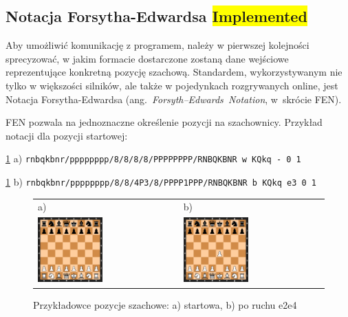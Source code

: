 \subsection{Notacja Forsytha-Edwardsa \colorbox{yellow}{Implemented}}
\label{subsec:notacja-fen}

Aby umożliwić komunikację z programem, należy w pierwszej kolejności sprecyzować, w jakim formacie dostarczone zostaną dane wejściowe reprezentujące konkretną pozycję szachową.
Standardem, wykorzystywanym nie tylko w większości silników, ale także w pojedynkach rozgrywanych online, jest Notacja Forsytha-Edwardsa (ang.~\emph{Forsyth–Edwards~Notation}, w~skrócie FEN).

FEN pozwala na jednoznaczne określenie pozycji na szachownicy.
Przykład notacji dla pozycji startowej:

\vspace{5mm}
\centerline{
    \ref{fig: figure} a) \lstset{basicstyle=\ttfamily}\lstinline{rnbqkbnr/pppppppp/8/8/8/8/PPPPPPPP/RNBQKBNR w KQkq - 0 1}
}
\centerline{
    \ref{fig: figure} b) \lstset{basicstyle=\ttfamily}\lstinline{rnbqkbnr/pppppppp/8/8/4P3/8/PPPP1PPP/RNBQKBNR b KQkq e3 0 1}
}
\vspace{5mm}

\begin{figure}[htb]
    \centering
    \begin{tabular}{@{}ll@{}}
        a) & b) \\
        \includegraphics[width=0.475\textwidth]{rozdzialy/rozdzial01/1_komunikacja-z-systemem/rysunki/pozycja_startowa}
        &
        \includegraphics[width=0.475\textwidth]{rozdzialy/rozdzial01/1_komunikacja-z-systemem/rysunki/pozycja_startowa_e2e4}
    \end{tabular}
    \caption{Przykładowce pozycje szachowe: a) startowa, b) po ruchu e2e4}
    \label{fig: figure}
\end{figure}


